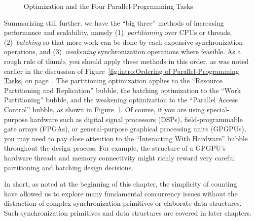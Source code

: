 \begin{figure}[tb]
\centering
{}
\caption{Optimization and the Four Parallel-Programming Tasks}
\label{fig:count:Optimization and the Four Parallel-Programming Tasks}
\end{figure}

Summarizing still further, we have the ``big three'' methods of
increasing performance and scalability, namely
(1)~\emph{partitioning} over CPUs or threads,
(2)~\emph{batching} so that more work can be done by each expensive
synchronization operations, and
(3)~\emph{weakening} synchronization operations where feasible.
As a rough rule of thumb, you should apply these methods in this order,
as was noted earlier in the discussion of
Figure~\ref{fig:intro:Ordering of Parallel-Programming Tasks}
on
page~\pageref{fig:intro:Ordering of Parallel-Programming Tasks}.
The partitioning optimization applies to the
``Resource Partitioning and Replication'' bubble,
the batching optimization to the ``Work Partitioning'' bubble,
and the weakening optimization to the ``Parallel Access Control'' bubble,
as shown in
Figure~\ref{fig:count:Optimization and the Four Parallel-Programming Tasks}.
Of course, if you are using special-purpose hardware such as
digital signal processors (DSPs), field-programmable gate arrays (FPGAs),
or general-purpose graphical processing units (GPGPUs), you may need
to pay close attention to the ``Interacting With Hardware'' bubble
throughout the design process.
For example, the structure of a GPGPU's hardware threads and memory
connectivity might richly reward very careful partitioning
and batching design decisions.

In short, as noted at the beginning of this chapter, the simplicity
of counting have allowed us to explore many
fundamental concurrency issues without the distraction of
complex synchronization primitives or elaborate data structures.
Such synchronization primitives and data structures are covered
in later chapters.
